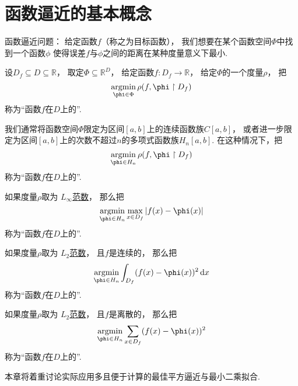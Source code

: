 \section{函数逼近的基本概念}
函数逼近问题：
给定函数\(f\)（称之为目标函数），
我们想要在某个函数空间\(\Phi\)中找到一个函数\(\phi\)
使得误差\(f\)与\(\phi\)之间的距离在某种度量意义下最小.
\begin{definition}
设\(D_f \subseteq D \subseteq \mathbb{R}\)，
取定\(\Phi \subseteq \mathbb{R}^{D}\)，
给定函数\(f\colon D_f \to \mathbb{R}\)，
给定\(\Phi\)的一个度量\(\rho\)，
把\begin{equation*}
	\argmin_{\phi \in \Phi} \rho(f,\phi \SetRestrict D_f)
\end{equation*}
称为“函数\(f\)在\(D\)上的”.
\end{definition}

我们通常将函数空间\(\Phi\)限定为区间\([a,b]\)上的连续函数族\(C[a,b]\)，
或者进一步限定为区间\([a,b]\)上的次数不超过\(n\)的多项式函数族\(H_n[a,b]\).
在这种情况下，把\begin{equation*}
	\argmin_{\phi \in H_n} \rho(f,\phi \SetRestrict D_f)
\end{equation*}
称为“函数\(f\)在\(D\)上的”.

如果度量\(\rho\)取为 \hyperref[equation:范数.连续函数的无穷范数]{\(L_\infty\)范数}，
那么把\begin{equation*}
	\argmin_{\phi \in H_n} \max_{x \in D_f} \abs{f(x) - \phi(x)}
\end{equation*}
称为“函数\(f\)在\(D\)上的”.

如果度量\(\rho\)取为 \hyperref[equation:范数.连续函数的L2范数]{\(L_2\)范数}，
且\(f\)是连续的，
那么把\begin{equation*}
	\argmin_{\phi \in H_n} \int_{D_f} (f(x) - \phi(x))^2 \dd{x}
\end{equation*}
称为“函数\(f\)在\(D\)上的”.

如果度量\(\rho\)取为 \hyperref[equation:范数.连续函数的L2范数]{\(L_2\)范数}，
且\(f\)是离散的，
那么把\begin{equation*}
	\argmin_{\phi \in H_n} \sum_{x \in D_f} (f(x) - \phi(x))^2
\end{equation*}
称为“函数\(f\)在\(D\)上的”.

本章将着重讨论实际应用多且便于计算的最佳平方逼近与最小二乘拟合.
